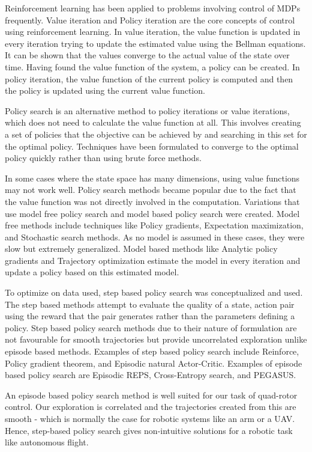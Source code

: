 \documentclass[hidelinks,BTech]{iitmdiss}
\begin{document}
Reinforcement learning has been applied to problems involving control of MDPs frequently. Value iteration and Policy iteration are the core concepts of control using reinforcement learning. In value iteration, the value function is updated in every iteration trying to update the estimated value using the Bellman equations. It can be shown that the values converge to the actual value of the state over time. Having found the value function of the system, a policy can be created. In policy iteration, the value function of the current policy is computed and then the policy is updated using the current value function.

Policy search is an alternative method to policy iterations or value iterations, which does not need to calculate the value function at all. This involves creating a set of policies that the objective can be achieved by and searching in this set for the optimal policy. Techniques have been formulated to converge to the optimal policy quickly rather than using brute force methods.

In some cases where the state space has many dimensions, using value functions may not work well. Policy search methods became popular due to the fact that the value function was not directly involved in the computation. Variations that use model free policy search and model based policy search were created. Model free methods include techniques like Policy gradients, Expectation maximization, and Stochastic search methods. As no model is assumed in these cases, they were slow but extremely generalized. Model based methods like Analytic policy gradients and Trajectory optimization estimate the model in every iteration and update a policy based on this estimated model.

To optimize on data used, step based policy search was conceptualized and used. The step based methods attempt to evaluate the quality of a state, action pair using the reward that the pair generates rather than the parameters defining a policy. Step based policy search methods due to their nature of formulation are not favourable for smooth trajectories but provide uncorrelated exploration unlike episode based methods. Examples of step based policy search include Reinforce, Policy gradient theorem, and Episodic natural Actor-Critic. Examples of episode based policy search are Episodic REPS, Cross-Entropy search, and PEGASUS.

An episode based policy search method is well suited for our task of quad-rotor control. Our exploration is correlated and the trajectories created from this are smooth - which is normally the case for robotic systems like an arm or a UAV. Hence, step-based policy search gives non-intuitive solutions for a robotic task like autonomous flight.
\end{document}
